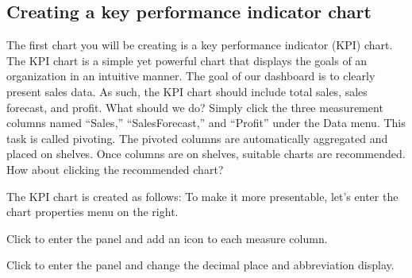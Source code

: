 \documentclass[letterpaper,10pt,english]{sphinxmanual}
\begin{document}
\subsection{Creating a key performance indicator chart}
\label{\detokenize{discovery/part00/step3:id1}}
The first chart you will be creating is a key performance indicator (KPI) chart. The KPI chart is a simple yet powerful chart that displays the goals of an organization in an intuitive manner. The goal of our dashboard is to clearly present sales data. As such, the KPI chart should include total sales, sales forecast, and profit. What should we do? Simply click the three measurement columns named “Sales,” “SalesForecast,” and “Profit” under the Data menu. This task is called pivoting. The pivoted columns are automatically aggregated and placed on shelves. Once columns are on shelves, suitable charts are recommended. How about clicking the recommended  chart?
\begin{quote}

\begin{figure}[H]
\centering

\noindent{}
\end{figure}
\end{quote}

The KPI chart is created as follows: To make it more presentable, let’s enter the chart properties menu on the right.
\begin{quote}

\begin{figure}[H]
\centering

\noindent{}
\end{figure}
\end{quote}

Click  to enter the  panel and add an icon to each measure column.
\begin{quote}

\begin{figure}[H]
\centering

\noindent{}
\end{figure}
\end{quote}

Click  to enter the  panel and change the decimal place and abbreviation display.
\begin{quote}

\begin{figure}[H]
\centering

\noindent{}
\end{figure}
\end{quote}
\end{document}
